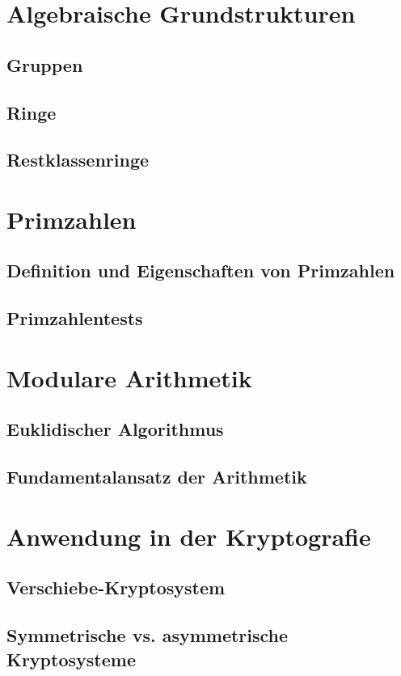 \documentclass[a4paper,10pt]{article}
\begin{document}
\section{Algebraische Grundstrukturen}
\subsection{Gruppen}
\subsection{Ringe}
\subsection{Restklassenringe}


\section{Primzahlen}
\subsection{Definition und Eigenschaften von Primzahlen}
\subsection{Primzahlentests}


\section{Modulare Arithmetik}
\subsection{Euklidischer Algorithmus}
\subsection{Fundamentalansatz der Arithmetik}



\section{Anwendung in der Kryptografie}
\subsection{Verschiebe-Kryptosystem}
\subsection{Symmetrische vs. asymmetrische Kryptosysteme}
\end{document}
